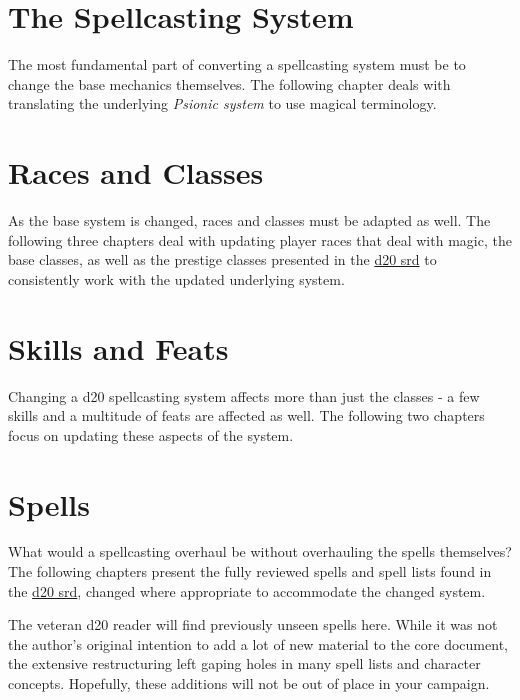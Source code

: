 \documentclass[a4paper,10pt]{article}
\begin{document}
\begin{multicols}{2}

\part{The Spellcasting System} %
The most fundamental part of converting a spellcasting system must be to change the base mechanics themselves. The following chapter deals with translating the underlying \emph{Psionic system} to use magical terminology.
 \newpage

\part{Races and Classes}
As the base system is changed, races and classes must be adapted as well. The following three chapters deal with updating player races that deal with magic, the base classes, as well as the prestige classes presented in the \href{http://www.wizards.com/default.asp?x=d20/article/srd35}{d20 srd} to consistently work with the updated underlying system.
 \newpage

\part{Skills and Feats}
Changing a d20 spellcasting system affects more than just the classes - a few skills and a multitude of feats are affected as well. The following two chapters focus on updating these aspects of the system.


\part{Spells}
What would a spellcasting overhaul be without overhauling the spells themselves? The following chapters present the fully reviewed spells and spell lists found in the \href{http://www.wizards.com/default.asp?x=d20/article/srd35}{d20 srd}, changed where appropriate to accommodate the changed system.

The veteran d20 reader will find previously unseen spells here. While it was not the author's original intention to add a lot of new material to the core document, the extensive restructuring left gaping holes in many spell lists and character concepts. Hopefully, these additions will not be out of place in your campaign.
\newpage


\end{multicols}
\end{document}
